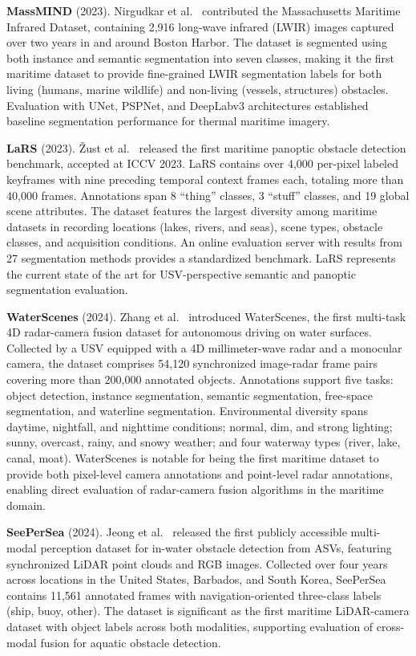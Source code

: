 \textbf{MassMIND} (2023). Nirgudkar et al.~\cite{Nirgudkar2023MassMIND} contributed
the Massachusetts Maritime Infrared Dataset, containing 2,916 long-wave infrared (LWIR)
images captured over two years in and around Boston Harbor. The dataset is segmented
using both instance and semantic segmentation into seven classes, making it the first
maritime dataset to provide fine-grained LWIR segmentation labels for both living
(humans, marine wildlife) and non-living (vessels, structures) obstacles. Evaluation with
UNet, PSPNet, and DeepLabv3 architectures established baseline segmentation performance
for thermal maritime imagery.

\textbf{LaRS} (2023). \v{Z}ust et al.~\cite{Zust2023LaRS} released the first maritime
panoptic obstacle detection benchmark, accepted at ICCV 2023. LaRS contains over 4,000
per-pixel labeled keyframes with nine preceding temporal context frames each, totaling
more than 40,000 frames. Annotations span 8 ``thing'' classes, 3 ``stuff'' classes, and
19 global scene attributes. The dataset features the largest diversity among maritime
datasets in recording locations (lakes, rivers, and seas), scene types, obstacle classes,
and acquisition conditions. An online evaluation server with results from 27 segmentation
methods provides a standardized benchmark. LaRS represents the current state of the art
for USV-perspective semantic and panoptic segmentation evaluation.

\textbf{WaterScenes} (2024). Zhang et al.~\cite{Zhang2024WaterScenes} introduced
WaterScenes, the first multi-task 4D radar-camera fusion dataset for autonomous driving
on water surfaces. Collected by a USV equipped with a 4D millimeter-wave radar and a
monocular camera, the dataset comprises 54,120 synchronized image-radar frame pairs
covering more than 200,000 annotated objects. Annotations support five tasks: object
detection, instance segmentation, semantic segmentation, free-space segmentation, and
waterline segmentation. Environmental diversity spans daytime, nightfall, and nighttime
conditions; normal, dim, and strong lighting; sunny, overcast, rainy, and snowy weather;
and four waterway types (river, lake, canal, moat). WaterScenes is notable for being the
first maritime dataset to provide both pixel-level camera annotations and point-level
radar annotations, enabling direct evaluation of radar-camera fusion algorithms in the
maritime domain.

\textbf{SeePerSea} (2024). Jeong et al.~\cite{Jeong2024SeePerSea} released the first
publicly accessible multi-modal perception dataset for in-water obstacle detection from
ASVs, featuring synchronized LiDAR point clouds and RGB images. Collected over four years
across locations in the United States, Barbados, and South Korea, SeePerSea contains
11,561 annotated frames with navigation-oriented three-class labels (ship, buoy, other).
The dataset is significant as the first maritime LiDAR-camera dataset with object labels
across both modalities, supporting evaluation of cross-modal fusion for aquatic obstacle
detection.

